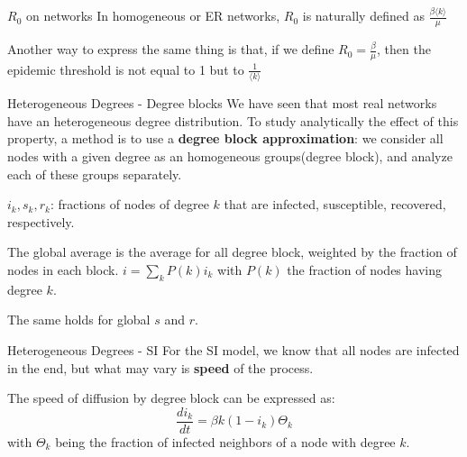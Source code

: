 \begin{textbox}{$R_0$ on networks}
    In homogeneous or ER networks, $R_0$ is naturally defined as $\frac{\beta \langle k \rangle}{\mu}$

    Another way to express the same thing is that, if we define $R_0=\frac{\beta}{\mu}$, then the epidemic threshold is not equal to 1 but to $\frac{1}{\langle k \rangle}$
\end{textbox}

\begin{textbox}{Heterogeneous Degrees - Degree blocks}
    We have seen that most real networks have an heterogeneous degree distribution. To study analytically the effect of this property, a method is to use a \textbf{degree block approximation}: we consider all nodes with a given degree as an homogeneous groups(degree block), and analyze each of these groups separately.

    $i_k,s_k,r_k$: fractions of nodes of degree $k$ that are infected, susceptible, recovered, respectively.

    The global average is the average for all degree block, weighted by the fraction of nodes in each block.
    $i=\sum_k P(k)i_k$
    with $P(k)$ the fraction of nodes having degree $k$.

    The same holds for global $s$ and $r$.
\end{textbox}

\begin{textbox}{Heterogeneous Degrees - SI}
    For the SI model, we know that all nodes are infected in the end, but what may vary is \textbf{speed} of the process.

    The speed of diffusion by degree block can be expressed as:
    \[
        \frac{di_k}{dt}= \beta k(1-i_k) \Theta_k
    \]
    with $\Theta_k$ being the fraction of infected neighbors of a node with degree $k$.
\end{textbox}


